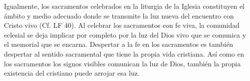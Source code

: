 Igualmente, los sacramentos celebrados en la liturgia de la Iglesia constituyen el ámbito y medio adecuado donde se transmite la luz nueva del encuentro con Cristo vivo (Cf. LF 40).
Al celebrar los sacramentos con fe viva, la comunidad eclesial se deja implicar por completo por la luz del Dios vivo que se comunica y el memorial que se encarna. Despertar a la fe en los sacramentos es también despertar al sentido sacramental que tiene la propia vida cristiana. Así como en los sacramentos los signos visibles comunican la luz de Dios, también la propia existencia del cristiano puede arrojar esa luz.


